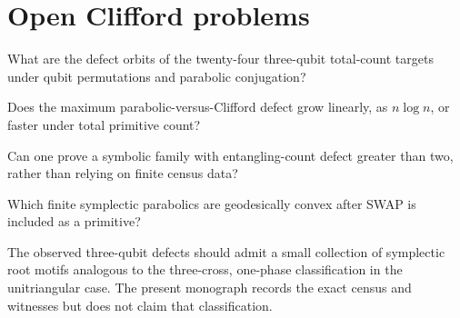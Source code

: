 \section{Open Clifford problems}
\begin{question}
What are the defect orbits of the twenty-four three-qubit total-count targets under qubit permutations and parabolic conjugation?
\end{question}
\begin{question}
Does the maximum parabolic-versus-Clifford defect grow linearly, as $n\log n$, or faster under total primitive count?
\end{question}
\begin{question}
Can one prove a symbolic family with entangling-count defect greater than two, rather than relying on finite census data?
\end{question}
\begin{question}
Which finite symplectic parabolics are geodesically convex after SWAP is included as a primitive?
\end{question}
\begin{conjecturebox}
The observed three-qubit defects should admit a small collection of symplectic root motifs analogous to the three-cross, one-phase classification in the unitriangular case.  The present monograph records the exact census and witnesses but does not claim that classification.
\end{conjecturebox}

